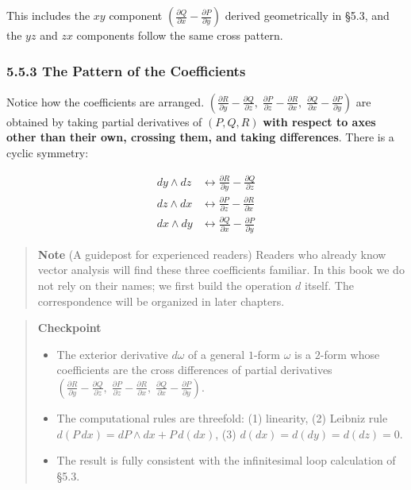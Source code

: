 This includes the \(xy\) component
\((\frac{\partial Q}{\partial x}-\frac{\partial P}{\partial y})\)
derived geometrically in §5.3, and the \(yz\) and \(zx\) components
follow the same cross pattern.

\hypertarget{the-pattern-of-the-coefficients}{%
\subsubsection{5.5.3 The Pattern of the
Coefficients}\label{the-pattern-of-the-coefficients}}

Notice how the coefficients are arranged.
\((\frac{\partial R}{\partial y} - \frac{\partial Q}{\partial z},\; \frac{\partial P}{\partial z} - \frac{\partial R}{\partial x},\; \frac{\partial Q}{\partial x} - \frac{\partial P}{\partial y})\)
are obtained by taking partial derivatives of \((P, Q, R)\)
\textbf{with respect to axes other than their own, crossing them, and taking differences}.
There is a cyclic symmetry:

\[\begin{aligned}
dy \wedge dz &\longleftrightarrow \frac{\partial R}{\partial y} - \frac{\partial Q}{\partial z} \\
dz \wedge dx &\longleftrightarrow \frac{\partial P}{\partial z} - \frac{\partial R}{\partial x} \\
dx \wedge dy &\longleftrightarrow \frac{\partial Q}{\partial x} - \frac{\partial P}{\partial y}
\end{aligned}\]

\begin{quote}
\textbf{Note} (A guidepost for experienced readers) Readers who already
know vector analysis will find these three coefficients familiar. In
this book we do not rely on their names; we first build the operation
\(d\) itself. The correspondence will be organized in later chapters.
\end{quote}

\begin{quote}
\textbf{Checkpoint}

\begin{itemize}
\item
  The exterior derivative \(d\omega\) of a general \(1\)-form \(\omega\)
  is a \(2\)-form whose coefficients are the cross differences of
  partial derivatives
  \((\frac{\partial R}{\partial y}-\frac{\partial Q}{\partial z},\; \frac{\partial P}{\partial z}-\frac{\partial R}{\partial x},\; \frac{\partial Q}{\partial x}-\frac{\partial P}{\partial y})\).
\item
  The computational rules are threefold: (1) linearity, (2) Leibniz rule
  \(d(P\,dx) = dP \wedge dx + P\,d(dx)\), (3) \(d(dx)=d(dy)=d(dz)=0\).
\item
  The result is fully consistent with the infinitesimal loop calculation
  of §5.3.
\end{itemize}
\end{quote}


